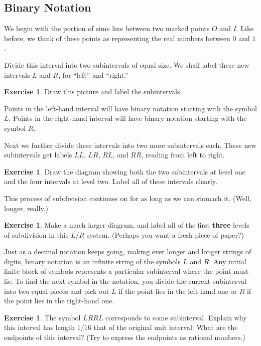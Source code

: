 \documentclass[12pt,letterpaper]{article}
\theoremstyle{definition}
\newtheorem{exercise}[question]{Exercise}
\begin{document}
\subsection*{Binary Notation}

We begin with the portion of sime line between two marked points $O$ and $I$.
Like before, we think of these points as representing the real numbers between $0$ and $1$.

Divide this interval into two subintervals of equal size.
We shall label these new intervals $L$ and $R$, for ``left'' and ``right.''

\begin{exercise}
Draw this picture and label the subintervals.
\end{exercise}

Points in the left-hand interval will have binary notation starting with the symbol $L$.
Points in the right-hand interval will have binary notation starting with the symbol $R$.

Next we further divide these intervals into two more subintervals each.
These new subintervals get labels $LL$, $LR$, $RL$, and $RR$, reading from left to right.

\begin{exercise}
Draw the diagram showing both the two subintervals at level one and the four intervals at level two.
Label all of these intervals clearly.
\end{exercise}

This process of subdivision continues on for as long as we can stomach it.
(Well, longer, really.)

\begin{exercise}
Make a much larger diagram, and label all of the first \textbf{three} levels of subdivision in this $L$/$R$ system.
(Perhaps you want a fresh piece of paper?)
\end{exercise}

Just as a decimal notation keeps going, making ever longer and longer strings of digits, binary notation is an infinite string of the symbols $L$ and $R$.
Any initial finite block of symbols represents a particular subinterval where the point must lie.
To find the next symbol in the notation, you divide the current subinterval into two equal pieces and pick out $L$ if the point lies in the left hand one or $R$ if the point lies in the right-hand one.

\begin{exercise}
The symbol $LRRL$ corresponds to some subinterval.
Explain why this interval has length $1/16$ that of the original unit interval.
What are the endpoints of this interval?
(Try to express the endpoints as rational numbers.)
\end{exercise}
\end{document}
